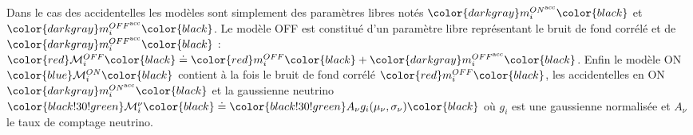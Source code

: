 
\bigbreak

Dans le cas des accidentelles les modèles sont simplement des paramètres libres notés $\color{darkgray}m_i^{ON^\textrm{acc}}\color{black}$ et $\color{darkgray}m_i^{OFF^\textrm{acc}}\color{black}$. Le modèle OFF est constitué d'un paramètre libre représentant le bruit de fond corrélé et de $\color{darkgray}m_i^{OFF^\textrm{acc}}\color{black}$ : $\color{red}\mathcal{M}_i^{OFF} \color{black} \doteq \color{red}m_i^{OFF}\color{black} + \color{darkgray}m_i^{OFF^\textrm{acc}}\color{black}$. Enfin le modèle ON $\color{blue}\mathcal{M}_i^{ON} \color{black}$ contient à la fois le bruit de fond corrélé $\color{red} m_i^{OFF}\color{black}$, les accidentelles en ON $\color{darkgray}m_i^{ON^\textrm{acc}}\color{black}$ et la gaussienne neutrino $\color{black!30!green} \mathcal{M}^\nu_i \color{black} \doteq \color{black!30!green}A_\nu g_i(\mu_\nu, \sigma_\nu)\color{black}$ où $g_i$ est une gaussienne normalisée et $A_\nu$ le taux de comptage neutrino.\\

